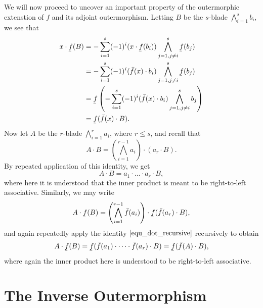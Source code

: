 \documentclass[12pt]{article}
\newcommand{\uf}{\underaccent{\bar}{f}}
\newcommand{\of}{\bar{f}}
\begin{document}
We will now proceed to uncover an important property of the outermorphic extenstion
of $f$ and its adjoint outermorphism.  Letting $B$ be the $s$-blade $\bigwedge_{i=1}^s b_i$,
we see that
\begin{align*}
x\cdot \uf(B) &= -\sum_{i=1}^s(-1)^i(x\cdot\uf(b_i))\bigwedge_{j=1,j\neq i}^s\uf(b_j) \\
 &= -\sum_{i=1}^s(-1)^i(\of(x)\cdot b_i)\bigwedge_{j=1,j\neq i}^s\uf(b_j) \\
 &= \uf\left(-\sum_{i=1}^s(-1)^i(\of(x)\cdot b_i)\bigwedge_{j=1,j\neq i}^s b_j\right) \\
 &= \uf(\of(x)\cdot B).
\end{align*}
Now let $A$ be the $r$-blade $\bigwedge_{i=1}^r a_i$, where $r\leq s$, and recall
that
\begin{equation}\label{equ_dot_recursive}
A\cdot B = \left(\bigwedge_{i=1}^{r-1} a_i\right)\cdot(a_r\cdot B).
\end{equation}
By repeated application of this identity, we get
\begin{equation*}
A\cdot B = a_1\cdot\dots\cdot a_r\cdot B,
\end{equation*}
where here it is understood that the inner product is meant to be right-to-left associative.
Similarly, we may write
\begin{equation*}
A\cdot\uf(B) = \left(\bigwedge_{i=1}^{r-1}\of(a_i)\right)\cdot\uf(\of(a_r)\cdot B),
\end{equation*}
and again repeatedly apply the identity $\eqref{equ_dot_recursive}$ recursively
to obtain
\begin{equation*}
A\cdot\uf(B) = \uf(\of(a_1)\cdot\dots\cdot\of(a_r)\cdot B) = \uf(\of(A)\cdot B),
\end{equation*}
where again the inner product here is understood to be right-to-left associative.

\section{The Inverse Outermorphism}
\end{document}

